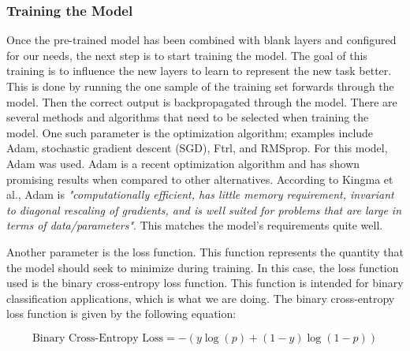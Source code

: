 \subsubsection{Training the Model}
Once the pre-trained model has been combined with blank layers and configured for our needs, the next step is to start training the model. The goal of this training is to influence the new layers to learn to represent the new task better. This is done by running the one sample of the training set forwards through the model. Then the correct output is backpropagated through the model. There are several methods and algorithms that need to be selected when training the model. One such parameter is the optimization algorithm; examples include Adam, stochastic gradient descent (SGD), Ftrl, and RMSprop. For this model, Adam was used. Adam is a recent optimization algorithm and has shown promising results when compared to other alternatives. According to Kingma et al.\cite{kingma2014adam}, Adam is \textit{"computationally efficient, has little memory requirement, invariant to diagonal rescaling of gradients, and is well suited for problems that are large in terms of data/parameters"}. This matches the model's requirements quite well. 

Another parameter is the loss function. This function represents the quantity that the model should seek to minimize during training. In this case, the loss function used is the binary cross-entropy loss function. This function is intended for binary classification applications, which is what we are doing. The binary cross-entropy loss function is given by the following equation:

$$
\text{Binary Cross-Entropy Loss}=-(y \log (p)+(1-y) \log (1-p))
$$

